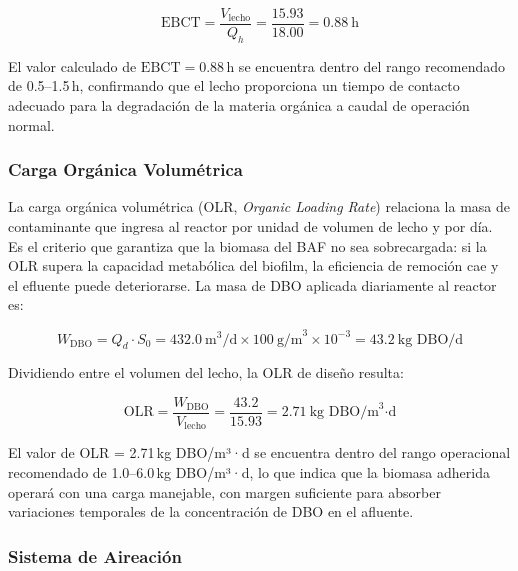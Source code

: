 \documentclass[12pt,a4paper]{article}
\newcommand{\captionequation}[1]{\vspace{-0.5em}\caption*{#1}\vspace{0.5em}}
\begin{document}
\begin{equation}
\text{EBCT} = \frac{V_{\text{lecho}}}{Q_{h}} = \frac{15.93}{18.00} = 0.88\ \text{h}
\end{equation}
\captionequation{Tiempo de contacto en lecho vacío a caudal medio}

El valor calculado de $\text{EBCT} = 0.88$\,h se encuentra dentro del rango recomendado de 0.5--1.5\,h, confirmando que el lecho proporciona un tiempo de contacto adecuado para la degradación de la materia orgánica a caudal de operación normal.

\subsubsection*{Carga Orgánica Volumétrica}

La carga orgánica volumétrica (OLR, \textit{Organic Loading Rate}) relaciona la masa de contaminante que ingresa al reactor por unidad de volumen de lecho y por día. Es el criterio que garantiza que la biomasa del BAF no sea sobrecargada: si la OLR supera la capacidad metabólica del biofilm, la eficiencia de remoción cae y el efluente puede deteriorarse. La masa de DBO aplicada diariamente al reactor es:

\begin{equation}
W_{\text{DBO}} = Q_{d} \cdot S_0 = 432.0\ \text{m}^3\text{/d} \times 100\ \text{g/m}^3 \times 10^{-3} = 43.2\ \text{kg DBO/d}
\end{equation}
\captionequation{Carga orgánica diaria aplicada al BAF}

Dividiendo entre el volumen del lecho, la OLR de diseño resulta:

\begin{equation}
\text{OLR} = \frac{W_{\text{DBO}}}{V_{\text{lecho}}} = \frac{43.2}{15.93} = 2.71\ \text{kg DBO/m}^3\text{·d}
\end{equation}
\captionequation{Carga orgánica volumétrica del BAF}

El valor de OLR = 2.71\,kg DBO/m³·d se encuentra dentro del rango operacional recomendado de 1.0--6.0\,kg DBO/m³·d, lo que indica que la biomasa adherida operará con una carga manejable, con margen suficiente para absorber variaciones temporales de la concentración de DBO en el afluente.

\subsubsection*{Sistema de Aireación}
\end{document}
